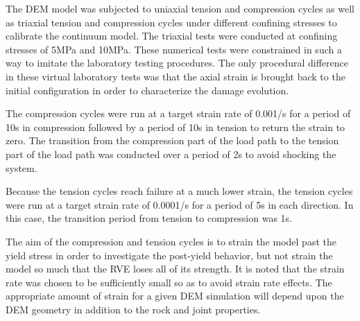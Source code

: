 The DEM model was subjected to uniaxial tension and compression cycles as well as triaxial tension and compression cycles under different confining stresses to calibrate the continuum model. The triaxial tests were conducted at confining stresses of 5MPa and 10MPa. These numerical tests were constrained in such a way to imitate the laboratory testing procedures. The only procedural difference in these virtual laboratory tests was that the axial strain is brought back to the initial configuration in order to characterize the damage evolution. 

The compression cycles were run at a target strain rate of 0.001/s for a period of 10s in compression followed by a period of 10s in tension to return the strain to zero. The transition from the compression part of the load path to the tension part of the load path was conducted over a period of 2s to avoid shocking the system.

Because the tension cycles reach failure at a much lower strain, the tension cycles were run at a target strain rate of 0.0001/s for a period of 5s in each direction. In this case, the transition period from tension to compression was  1s.

The aim of the compression and tension cycles is to strain the model past the yield stress in order to investigate the post-yield behavior, but not strain the model so much that the RVE loses all of its strength. It is noted that the strain rate was chosen to be sufficiently small so as to avoid strain rate effects. The appropriate amount of strain for a given DEM simulation will depend upon the DEM geometry in addition to the rock and joint properties. 

